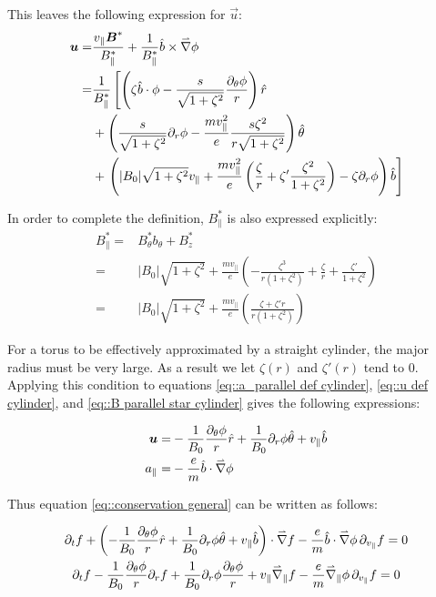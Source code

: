 This leaves the following expression for $\vec{u}$:
\begin{align}
\boldsymbol{u} =& \frac{v_\parallel\boldsymbol{B}^*}{B_\parallel^*} + \frac{1}{B_\parallel^*} \hat{b}\times\accentset{\rightharpoonup}{\nabla}\phi\nonumber\\
=& \frac{1}{B_\parallel^*} \left[\left(\zeta\hat{b}\cdot\phi - \frac{s}{\sqrt{1+\zeta^2}}\frac{\partial_\theta\phi}{r}\right)\hat{r} \right.\nonumber\\
&+ \left(\frac{s}{\sqrt{1+\zeta^2}}\partial_r\phi - \frac{mv_\parallel^2}{e}\frac{s\zeta^2}{r\sqrt{1+\zeta^2}}\right)\hat{\theta}\nonumber\\
&+ \left.\left(|B_0|\sqrt{1+\zeta^2}v_\parallel + \frac{mv_\parallel^2}{e}\left(\frac{\zeta}{r} + \zeta'\frac{\zeta^2}{1+\zeta^2}\right)-\zeta \partial_r\phi\right)\hat{b}\right]\label{eq::u def cylinder}
\end{align}

In order to complete the definition, $B^*_\parallel$ is also expressed explicitly:
\begin{align}
 B^*_\parallel =& B^*_\theta b_\theta + B^*_z\nonumber\\
 =& |B_0|\sqrt{1+\zeta^2} + \frac{mv_\parallel}{e}\left(-\frac{\zeta^3}{r\left(1+\zeta^2\right)} + \frac{\zeta}{r} + \frac{\zeta'}{1+\zeta^2}\right)\nonumber \\
 =& |B_0|\sqrt{1+\zeta^2} + \frac{mv_\parallel}{e}\left(\frac{\zeta+\zeta'r}{r\left(1+\zeta^2\right)}\right)\label{eq::B parallel star cylinder}
\end{align}

For a torus to be effectively approximated by a straight cylinder, the major radius must be very large. As a result we let $\zeta(r)$ and $\zeta'(r)$ tend to 0. Applying this condition to equations \ref{eq::a_parallel def cylinder}, \ref{eq::u def cylinder}, and \ref{eq::B parallel star cylinder} gives the following expressions:

\begin{align}
 \boldsymbol{u} =& -\frac{1}{B_0}\frac{\partial_\theta\phi}{r} \hat{r} + \frac{1}{B_0}\partial_r\phi\hat{\theta} + v_\parallel \hat{b}\\
 a_\parallel =& -\frac{e}{m}\hat{b}\cdot\accentset{\rightharpoonup}{\nabla}\phi
\end{align}

Thus equation \ref{eq::conservation general} can be written as follows:

\begin{gather}
 \partial_t f + \left(-\frac{1}{B_0}\frac{\partial_\theta\phi}{r} \hat{r}+\frac{1}{B_0}\partial_r\phi\hat{\theta} + v_\parallel \hat{b}\right)\cdot\accentset{\rightharpoonup}{\nabla} f -\frac{e}{m}\hat{b}\cdot\accentset{\rightharpoonup}{\nabla}\phi\,  \partial_{v_\parallel} f=0\\
 \partial_t f -\frac{1}{B_0}\frac{\partial_\theta\phi}{r} \partial_r f + \frac{1}{B_0}\partial_r\phi \frac{\partial_\theta\phi}{r} + v_\parallel \accentset{\rightharpoonup}{\nabla}_\parallel f - \frac{e}{m}\accentset{\rightharpoonup}{\nabla}_\parallel\phi\,  \partial_{v_\parallel} f=0
\end{gather}

